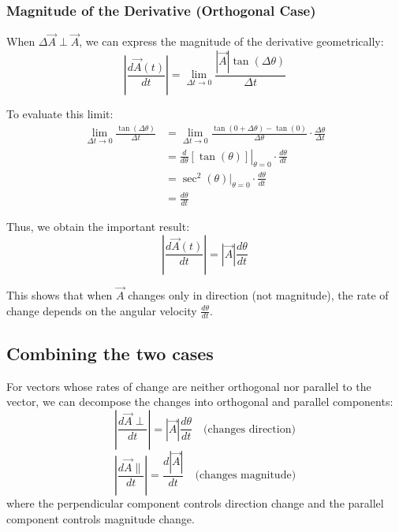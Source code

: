 \documentclass{article}
\begin{document}
\vspace{1em}

\subsubsection*{Magnitude of the Derivative (Orthogonal Case)}

When $\Delta \vec{A} \perp \vec{A}$, we can express the magnitude of the derivative geometrically:
\[
\left|\frac{d\vec{A}(t)}{dt}\right| = \lim_{\Delta t\to0}\frac{|\vec{A}| \tan(\Delta\theta)}{\Delta t}
\]

To evaluate this limit:
\begin{align*}
    \lim_{\Delta t\to0}\frac{\tan(\Delta\theta)}{\Delta t} 
    &= \lim_{\Delta t\to0}\frac{\tan(0 + \Delta\theta) - \tan(0)}{\Delta\theta} \cdot \frac{\Delta\theta}{\Delta t} \\[0.5em]
    &= \left.\frac{d}{d\theta}[\tan(\theta)]\right|_{\theta = 0} \cdot \frac{d\theta}{dt} \\[0.5em]
    &= \sec^2(\theta)\Big|_{\theta = 0} \cdot \frac{d\theta}{dt} \\[0.5em]
    &= \frac{d\theta}{dt}
\end{align*}

Thus, we obtain the important result:
\[
\left|\frac{d\vec{A}(t)}{dt}\right| = |\vec{A}| \frac{d\theta}{dt}
\]

This shows that when $\vec{A}$ changes only in direction (not magnitude), the rate of change depends on the angular velocity $\frac{d\theta}{dt}$.

\subsection*{Combining the two cases}
For vectors whose rates of change are neither orthogonal nor parallel to the vector, we can decompose the changes into orthogonal and parallel components:
\[
\left|\frac{d\vec{A}{\perp}}{dt}\right| = |\vec{A}| \frac{d\theta}{dt} \quad \text{(changes direction)}
\]
\[
\left|\frac{d\vec{A}{\parallel}}{dt}\right| = \frac{d|\vec{A}|}{dt} \quad \text{(changes magnitude)}
\]
where the perpendicular component controls direction change and the parallel component controls magnitude change.
\end{document}
